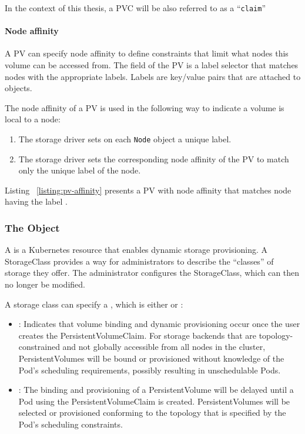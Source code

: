 In the context of this thesis, a PVC will be also referred to as a
``\texttt{claim}''

\paragraph*{Node affinity}
\label{section:background-pv-node-affinity}

A PV can specify node affinity to define constraints that limit what nodes this
volume can be accessed from. The  field of the PV is a label
selector that matches nodes with the appropriate labels. Labels are key/value
pairs that are attached to objects.

The node affinity of a PV is used in the following way to indicate a volume is
local to a node:
\begin{enumerate}
	\tightlist
	\item The storage driver sets on each \texttt{Node} object a unique label.
	\item The storage driver sets the corresponding node affinity of the PV to
	      match only the unique label of the node.
\end{enumerate}

Listing ~\ref{listing:pv-affinity} presents a PV with node affinity that matches
node having the label .



\subsubsection{The  Object}

A  is a Kubernetes resource that enables dynamic storage
provisioning. A StorageClass provides a way for administrators to describe the
``classes'' of storage they offer. The administrator configures the
StorageClass, which can then no longer be modified.

A storage class can specify a , which is either
 or :
\begin{itemize}
	\item  {}: Indicates that volume binding and dynamic
	      provisioning occur once the user creates the PersistentVolumeClaim.
	      For storage backends that are topology-constrained and not globally
	      accessible from all nodes in the cluster, PersistentVolumes will be
	      bound or provisioned without knowledge of the Pod's scheduling
	      requirements, possibly resulting in unschedulable Pods.
	\item {}: The binding and provisioning of a
	      PersistentVolume will be delayed until a Pod using the
	      PersistentVolumeClaim is created. PersistentVolumes will be selected
	      or provisioned conforming to the topology that is specified by the
	      Pod's scheduling constraints.
\end{itemize}


